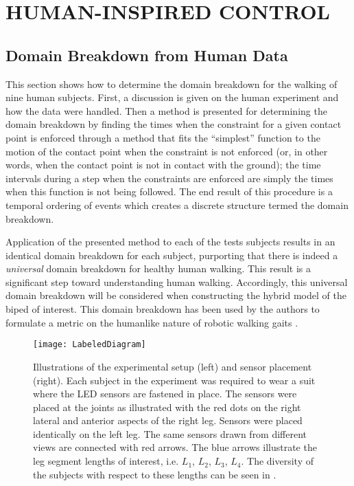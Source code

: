 \chapter{\uppercase{Human-Inspired Control}} \label{ch:hic}

\section{Domain Breakdown from Human Data} \label{sec:domainbreakdown} \noindent
This section shows how to determine the domain breakdown for the walking of nine
human subjects.
%
First, a discussion is given on the human experiment and how the data were
handled.
%
Then a method is presented for determining the domain breakdown by finding the
times when the constraint for a given contact point is enforced through a method
that fits the ``simplest'' function to the motion of the contact point when the
constraint is not enforced (or, in other words, when the contact point is not in
contact with the ground);
%
the time intervals during a step when the constraints are enforced are simply
the times when this function is not being followed.
%
The end result of this procedure is a temporal ordering of events which creates
a discrete structure termed the domain breakdown.

Application of the presented method to each of the tests subjects results in an
identical domain breakdown for each subject, purporting that there is indeed a
{\em universal} domain breakdown for healthy human walking.
%
This result is a significant step toward understanding human walking.
%
Accordingly, this universal domain breakdown will be considered when
constructing the hybrid model of the biped of interest.
%
This domain breakdown has been used by the authors to formulate a metric on the
humanlike nature of robotic walking gaits \cite{Ames2011,Vasudevan2013}.

\begin{figure}[t!]
  \centering
  \texttt{[image: LabeledDiagram]}
  \caption[Illustrations of the experimental setup and sensor
  placement.]{Illustrations of the experimental setup (left) and sensor
    placement (right).
    Each subject in the experiment was required to wear a suit where the LED
    sensors are fastened in place.
    The sensors were placed at the joints as illustrated with the red dots on
    the right lateral and anterior aspects of the right leg.
    Sensors were placed identically on the left leg.
    The same sensors drawn from different views are connected with red arrows.
    The blue arrows illustrate the leg segment lengths of interest, i.e. $L_1$,
    $L_2$, $L_3$, $L_4$.
    The diversity of the subjects with respect to these lengths can be seen in
    .}
  \label{fig:Sensors}
\end{figure}

